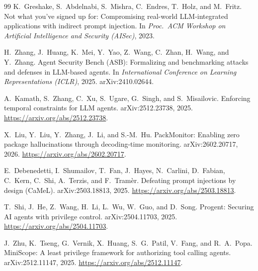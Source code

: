\begin{thebibliography}{99}
K.~Greshake, S.~Abdelnabi, S.~Mishra, C.~Endres, T.~Holz, and M.~Fritz.
\newblock Not what you've signed up for: Compromising real-world LLM-integrated applications with indirect prompt injection.
\newblock In \emph{Proc.\ ACM Workshop on Artificial Intelligence and Security (AISec)}, 2023.

H.~Zhang, J.~Huang, K.~Mei, Y.~Yao, Z.~Wang, C.~Zhan, H.~Wang, and Y.~Zhang.
\newblock Agent Security Bench (ASB): Formalizing and benchmarking attacks and defenses in LLM-based agents.
\newblock In \emph{International Conference on Learning Representations (ICLR)}, 2025.
\newblock arXiv:2410.02644.

A.~Kamath, S.~Zhang, C.~Xu, S.~Ugare, G.~Singh, and S.~Misailovic.
\newblock Enforcing temporal constraints for LLM agents.
\newblock arXiv:2512.23738, 2025. \url{https://arxiv.org/abs/2512.23738}.

X.~Liu, Y.~Liu, Y.~Zhang, J.~Li, and S.-M.~Hu.
\newblock PackMonitor: Enabling zero package hallucinations through decoding-time monitoring.
\newblock arXiv:2602.20717, 2026. \url{https://arxiv.org/abs/2602.20717}.

E.~Debenedetti, I.~Shumailov, T.~Fan, J.~Hayes, N.~Carlini, D.~Fabian, C.~Kern, C.~Shi, A.~Terzis, and F.~Tram\`er.
\newblock Defeating prompt injections by design (CaMeL).
\newblock arXiv:2503.18813, 2025. \url{https://arxiv.org/abs/2503.18813}.

T.~Shi, J.~He, Z.~Wang, H.~Li, L.~Wu, W.~Guo, and D.~Song.
\newblock Progent: Securing AI agents with privilege control.
\newblock arXiv:2504.11703, 2025. \url{https://arxiv.org/abs/2504.11703}.

J.~Zhu, K.~Tseng, G.~Vernik, X.~Huang, S.~G.~Patil, V.~Fang, and R.~A.~Popa.
\newblock MiniScope: A least privilege framework for authorizing tool calling agents.
\newblock arXiv:2512.11147, 2025. \url{https://arxiv.org/abs/2512.11147}.


\end{thebibliography}
